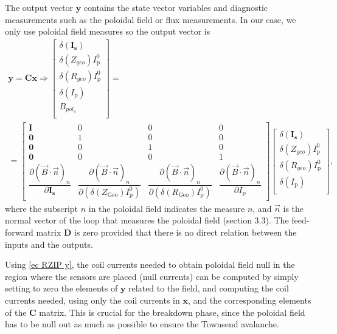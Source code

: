 \documentclass[a4paper,12pt,oneside]{book}
\newcommand{\p}{\partial}
\begin{document}
The output vector $\boldsymbol{y}$ contains the state vector variables and diagnostic measurements such as the poloidal field or flux measurements. In our case, we only use poloidal field measures so the output vector is
%
\begin{equation}\label{ec RZIP y}
	\left.
	\begin{array}{c}
		\boldsymbol{y}=\boldsymbol{C} \boldsymbol{x} \Rightarrow
		\left[
		\begin{array}{c}
		\delta(\boldsymbol{I_\text{s}}) \\
		\delta(Z_{geo}) I_\text{p}^0 \\
		\delta(R_{geo}) I_\text{p}^0 \\
		\delta(I_\text{p}) \\
		B_{pol_n} \\
		\end{array}
		\right]
		=
		\\
		=
		\left[
		\begin{array}{cccc}
		\boldsymbol{I} & 0 & 0 & 0\\
		\boldsymbol{0} & 1 & 0 & 0\\
		\boldsymbol{0} & 0 & 1 & 0\\	
		\boldsymbol{0} & 0 & 0 & 1\\	
		\dfrac{\p (\vec{B} \cdot \vec{n})_n}{\p \boldsymbol{I_				\text{s}}} & \dfrac{\p (\vec{B} \cdot \vec{n})_n}{\p (\delta(Z_\text{Geo})I_\text{p}^0)} & \dfrac{\p (\vec{B} \cdot \vec{n})_n}{\p (\delta(R_\text{Geo})I_\text{p}^0)} & \dfrac{\p (\vec{B} \cdot \vec{n})_n}{\p I_\text{p}}
		\end{array}
		\right]
		\left[
		\begin{array}{c}
		\delta(\boldsymbol{I_\text{s}}) \\
		\delta(Z_{geo}) I_\text{p}^0 \\
		\delta(R_{geo}) I_\text{p}^0 \\
		\delta(I_\text{p}) \\
		\end{array}\right],
	\end{array} \right.
\end{equation}
where the subscript $n$ in the poloidal field indicates the measure $n$, and $\vec{n}$ is the normal vector of the loop that measures the poloidal field\cite{AtiSharmaTesis} (section 3.3). The feed-forward matrix $\boldsymbol{D}$ is zero provided that there is no direct relation between the inputs and the outputs. 

Using \eqref{ec RZIP y}, the coil currents needed to obtain poloidal field null in the region where the sensors are placed (null currents) can be computed by simply setting to zero the elements of $\boldsymbol{y}$ related to the field, and computing the coil currents needed, using only the coil currents in $\boldsymbol{x}$, and the corresponding elements of the $\boldsymbol{C}$ matrix.  This is crucial for the breakdown phase, since the poloidal field has to be null out as much as possible to ensure the Townsend avalanche.
\end{document}

